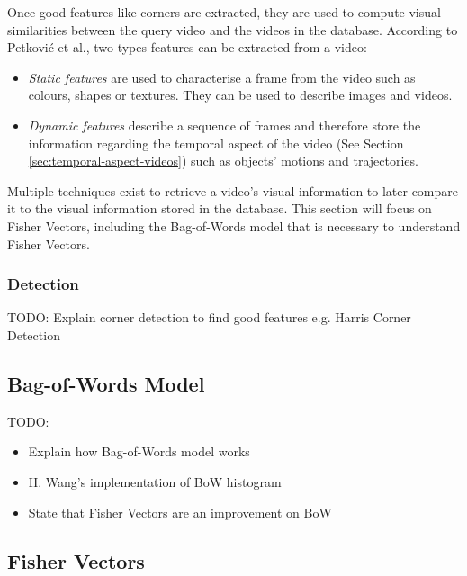 \documentclass[11pt,openany,a4paper]{article}
\begin{document}
Once good features like corners are extracted, they are used to compute visual similarities between the query video and the videos in the database. According to Petković et al., two types features can be extracted from a video: 
\begin{itemize}
    \item \textit{Static features} are used to characterise a frame from the video such as colours, shapes or textures. They can be used to describe images and videos.
    \item \textit{Dynamic features} describe a sequence of frames and therefore store the information regarding the temporal aspect of the video (See Section \ref{sec:temporal-aspect-videos}) such as objects' motions and trajectories.
\end{itemize}

Multiple techniques exist to retrieve a video's visual information to later compare it to the visual information stored in the database. This section will focus on Fisher Vectors, including the Bag-of-Words model that is necessary to understand Fisher Vectors.

\subsubsection{Detection}
\label{sec:corner-detection}

TODO: Explain corner detection to find good features e.g. Harris Corner Detection


\subsection{Bag-of-Words Model}
\label{sec:BoW}

TODO:
\begin{itemize}
    \item Explain how Bag-of-Words model works
    \item H. Wang's implementation of BoW histogram \cite{wang2016actionregonition}
    \item State that Fisher Vectors are an improvement on BoW
\end{itemize}


\subsection{Fisher Vectors}
\label{sec:fisher-vectors}
\end{document}

